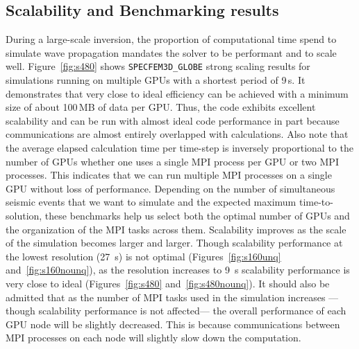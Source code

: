 \subsection{Scalability and Benchmarking results}

During a large-scale inversion, the proportion of computational time spend to
simulate wave propagation mandates the solver to be performant and to scale
well.
Figure~\ref{fig:s480} shows \texttt{SPECFEM3D\_GLOBE} strong scaling results
for simulations running on multiple GPUs with a shortest period of 9\,s. It
demonstrates that very close to ideal efficiency can be achieved with a minimum
size of about 100\,MB of data per GPU. Thus, the code exhibits excellent scalability
and can be run with almost ideal code performance in part because communications
are almost entirely overlapped with calculations. Also note that the average
elapsed calculation time per time-step is inversely proportional to the number
of GPUs whether one uses a single MPI process per GPU or two MPI processes. This
indicates that we can run multiple MPI processes on a single GPU without loss of
performance. Depending on the number of simultaneous seismic events that we want
to simulate and the expected maximum time-to-solution, these benchmarks help us
select both the optimal number of GPUs and the organization of the MPI tasks
across them. Scalability improves as the scale of the simulation becomes larger
and larger. Though scalability performance at the lowest resolution (27~s) is
not optimal (Figures~\ref{fig:s160unq} and~\ref{fig:s160nounq}), as the
resolution increases to 9~s scalability performance is very close to
ideal (Figures~\ref{fig:s480} and~\ref{fig:s480nounq}). It should also be
admitted that as the number of MPI tasks used in the simulation increases
---though scalability performance is not affected--- the overall performance of
each GPU node will be slightly decreased. This is because communications
between MPI processes on each node will slightly slow down the computation.

